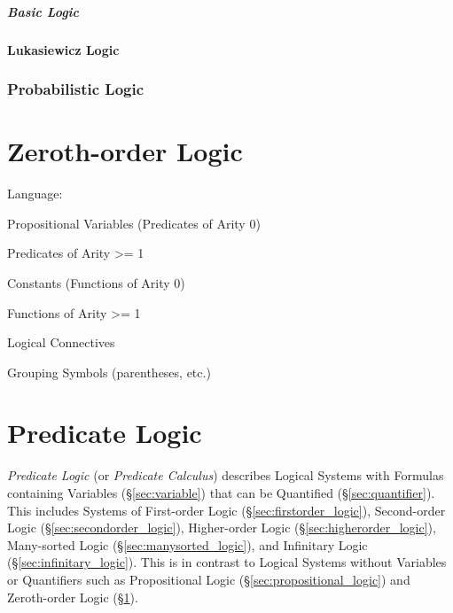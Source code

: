 \subparagraph{Basic Logic}\label{sec:basic_logic}



\paragraph{Lukasiewicz Logic}\label{sec:lukasiewicz_logic}





\subsubsection{Probabilistic Logic}\label{sec:probabilistic_logic}



\section{Zeroth-order Logic}\label{sec:zerothorder_logic}


Language:

Propositional Variables (Predicates of Arity 0)

Predicates of Arity >= 1

Constants (Functions of Arity 0)

Functions of Arity >= 1

Logical Connectives

Grouping Symbols (parentheses, etc.)



\section{Predicate Logic}\label{sec:predicate_logic}

\emph{Predicate Logic} (or \emph{Predicate Calculus}) describes
Logical Systems with Formulas containing Variables
(\S\ref{sec:variable}) that can be Quantified
(\S\ref{sec:quantifier}). This includes Systems of First-order Logic
(\S\ref{sec:firstorder_logic}), Second-order Logic
(\S\ref{sec:secondorder_logic}), Higher-order Logic
(\S\ref{sec:higherorder_logic}), Many-sorted Logic
(\S\ref{sec:manysorted_logic}), and Infinitary Logic
(\S\ref{sec:infinitary_logic}). This is in contrast to Logical Systems
without Variables or Quantifiers such as Propositional Logic
(\S\ref{sec:propositional_logic}) and Zeroth-order Logic
(\S\ref{sec:zerothorder_logic}).

